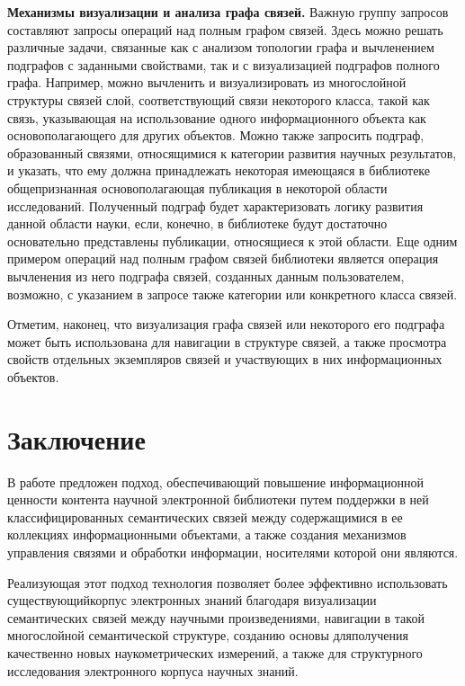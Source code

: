 \begin{multicols}{2}
  \smallskip
  
  \textbf{Механизмы визуализации и анализа графа связей.} Важную группу 
запросов составляют запросы операций над полным графом связей. Здесь 
можно решать различные задачи, связанные как с анализом топологии графа и 
вычленением подграфов с заданными свойствами, так и с визуализацией 
подграфов полного графа. Например, можно вычленить и визуализировать из 
многослойной структуры связей слой, соответствующий связи некоторого 
класса, такой как связь, указывающая на использование одного 
информационного объекта как основополагающего для других объектов. 
Можно также запросить подграф, образованный связями, относящимися к 
категории развития научных результатов, и указать, что ему должна 
принадлежать некоторая имеющаяся в библиотеке общепризнанная 
основополагающая публикация в некоторой области исследований. 
Полученный подграф будет характеризовать логику развития данной области 
науки, если, конечно, в библиотеке будут достаточно основательно 
представлены публикации, относящиеся к этой области. Еще одним примером 
операций над полным графом связей библиотеки является операция 
вычленения из него подграфа связей, созданных данным пользователем, 
возможно, с указанием в запросе также категории или конкретного класса 
связей.
  
  Отметим, наконец, что визуализация графа связей или некоторого его 
подграфа может быть использована для навигации в структуре связей, а также 
просмотра свойств отдельных экземпляров связей и участвующих в них 
информационных объектов.


\section{Заключение}

  В работе предложен подход, обеспечивающий повышение информационной 
ценности контента
 научной электронной библиотеки путем поддержки в ней 
классифицированных семантических связей между содержащимися в ее 
коллекциях информационными объектами, а также создания механизмов 
управления связями и обработки информации, носителями которой они 
являются.
  
  Реализующая этот подход технология позволяет более эффективно 
использовать существующий\linebreak корпус электронных знаний благодаря 
визуализации семантических связей между научными произведениями, 
навигации в такой многослойной семантической структуре, созданию основы 
для\linebreak получения качественно новых наукометрических измерений, а также для 
структурного исследования электронного корпуса научных знаний. 
  

\end{multicols}
